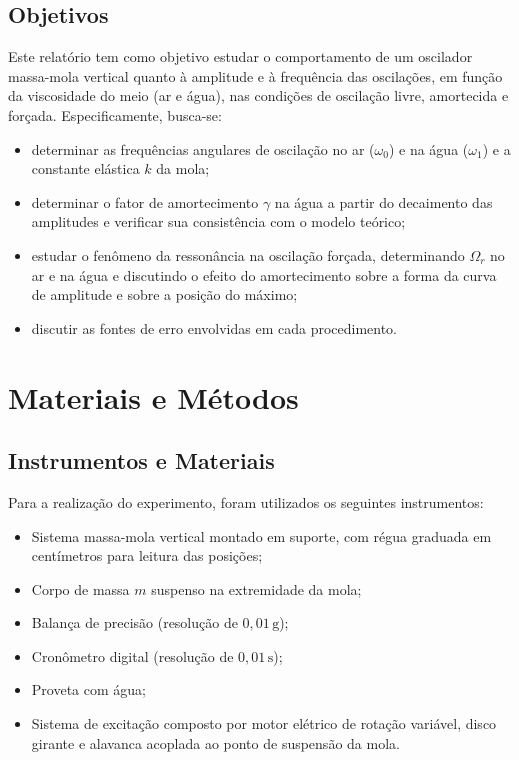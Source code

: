 \documentclass[12pt, a4paper]{article}
\newcommand{\un}[1]{\,\mathrm{#1}}
\begin{document}
\subsection{Objetivos}

Este relatório tem como objetivo estudar o comportamento de um oscilador massa-mola vertical quanto à amplitude e à frequência das oscilações, em função da viscosidade do meio (ar e água), nas condições de oscilação livre, amortecida e forçada. Especificamente, busca-se:
\begin{itemize}
    \item determinar as frequências angulares de oscilação no ar ($\omega_0$) e na água ($\omega_1$) e a constante elástica $k$ da mola;
    \item determinar o fator de amortecimento $\gamma$ na água a partir do decaimento das amplitudes e verificar sua consistência com o modelo teórico;
    \item estudar o fenômeno da ressonância na oscilação forçada, determinando $\Omega_r$ no ar e na água e discutindo o efeito do amortecimento sobre a forma da curva de amplitude e sobre a posição do máximo;
    \item discutir as fontes de erro envolvidas em cada procedimento.
\end{itemize}

\section{Materiais e Métodos}

\subsection{Instrumentos e Materiais}

Para a realização do experimento, foram utilizados os seguintes instrumentos:
\begin{itemize}
    \item Sistema massa-mola vertical montado em suporte, com régua graduada em centímetros para leitura das posições;
    \item Corpo de massa $m$ suspenso na extremidade da mola;
    \item Balança de precisão (resolução de $0{,}01\un{g}$);
    \item Cronômetro digital (resolução de $0{,}01\un{s}$);
    \item Proveta com água;
    \item Sistema de excitação composto por motor elétrico de rotação variável, disco girante e alavanca acoplada ao ponto de suspensão da mola.
\end{itemize}
\end{document}
